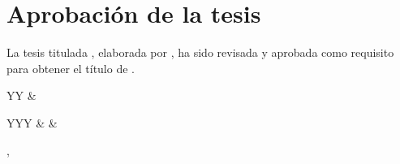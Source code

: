 \chapter*{Aprobación de la tesis}
\thispagestyle{plain}

La tesis titulada \textbf{\tituloTesis}, elaborada por \textbf{\autorTesis},
ha sido revisada y aprobada como requisito para obtener el título de
\textbf{\gradoObtener}.

\vspace{0.35cm}
\begingroup
\setlength{\tabcolsep}{8pt}
\renewcommand{\arraystretch}{1.05}
\noindent\begin{tabularx}{\textwidth}{YY}
   &
  \iftieneCodirector
  \else
    \mbox{}
  \fi
\end{tabularx}
\vspace{0.3cm}
\noindent\begin{tabularx}{\textwidth}{YYY}
   &
   &
\end{tabularx}
\endgroup

\vfill
\begin{center}
  \lugarPublicacion, \mesAnioPublicacion
\end{center}

